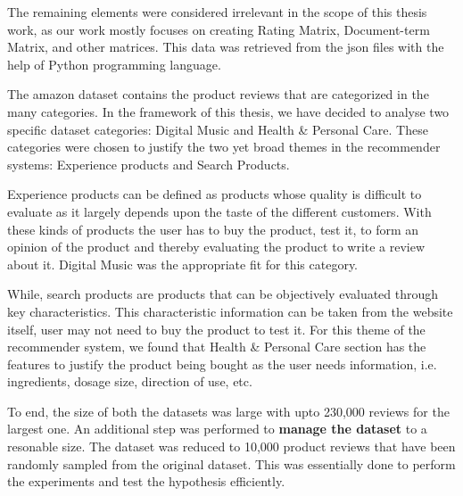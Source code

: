 \smallskip

The remaining elements were considered irrelevant in the scope of this thesis work, as our work mostly focuses on creating Rating Matrix, Document-term Matrix, and other matrices. This data was retrieved from the json files with the help of Python programming language.

The amazon dataset contains the product reviews that are categorized in the many categories. In the framework of this thesis, we have decided to analyse two specific dataset categories: Digital Music and Health \& Personal Care. These categories were chosen to justify the two yet broad themes in the recommender systems: Experience products and Search Products. 

Experience products can be defined as products whose quality is difficult to evaluate as it largely depends upon the taste of the different customers. With these kinds of products the user has to buy the product, test it, to form an opinion of the product and thereby evaluating the product to write a review about it. Digital Music was the appropriate fit for this category.

While, search products are products that can be objectively evaluated through key characteristics. This characteristic information can be taken from the website itself, user may not need to buy the product to test it. For this theme of the recommender system, we found that Health \& Personal Care section has the features to justify the product being bought as the user needs information, i.e. ingredients, dosage size, direction of use, etc.

To end, the size of both the datasets was large with upto 230,000 reviews for the largest one. An additional step was performed to \textbf{manage the dataset} to a resonable size. The dataset was reduced to 10,000 product reviews that have been randomly sampled from the original dataset. This was essentially done to perform the experiments and test the hypothesis efficiently.






